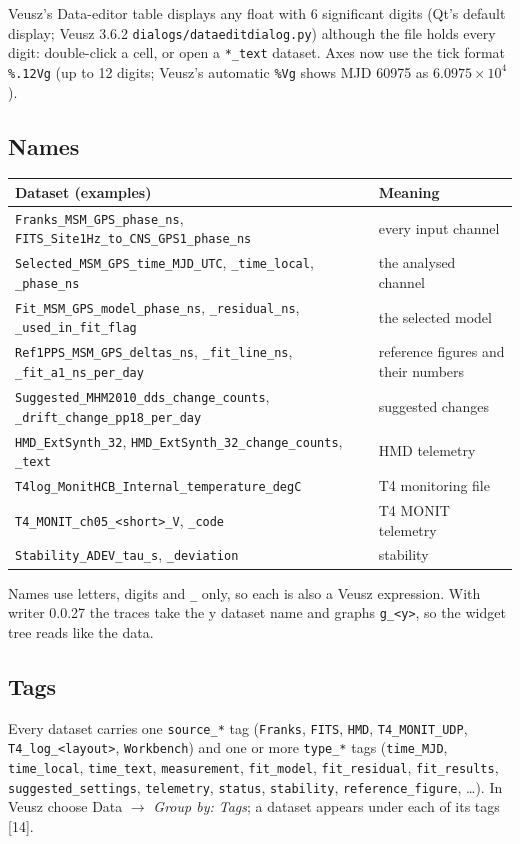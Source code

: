 \documentclass[11pt,a4paper]{article}
\begin{document}
Veusz's Data-editor table displays any float with 6 significant digits (Qt's default display; Veusz
3.6.2 \texttt{dialogs/dataeditdialog.py}) although the file holds every digit: double-click a cell,
or open a \texttt{*\_text} dataset. Axes now use the tick format \texttt{\%.12Vg} (up to 12 digits;
Veusz's automatic \texttt{\%Vg} shows MJD 60975 as \(6.0975\times10^4\)).

\subsection{Names}
\begin{center}
\small
\begin{tabular}{@{}p{.42\linewidth}p{.5\linewidth}@{}}
\toprule
Dataset (examples) & Meaning\\
\midrule
\texttt{Franks\_MSM\_GPS\_phase\_ns}, \texttt{FITS\_Site1Hz\_to\_CNS\_GPS1\_phase\_ns} & every input channel\\
\texttt{Selected\_MSM\_GPS\_time\_MJD\_UTC}, \texttt{\_time\_local}, \texttt{\_phase\_ns} & the analysed channel\\
\texttt{Fit\_MSM\_GPS\_model\_phase\_ns}, \texttt{\_residual\_ns}, \texttt{\_used\_in\_fit\_flag} & the selected model\\
\texttt{Ref1PPS\_MSM\_GPS\_deltas\_ns}, \texttt{\_fit\_line\_ns}, \texttt{\_fit\_a1\_ns\_per\_day} & reference figures and their numbers\\
\texttt{Suggested\_MHM2010\_dds\_change\_counts}, \texttt{\_drift\_change\_pp18\_per\_day} & suggested changes\\
\texttt{HMD\_ExtSynth\_32}, \texttt{HMD\_ExtSynth\_32\_\allowbreak change\_counts}, \texttt{\_text} & HMD telemetry\\
\texttt{T4log\_MonitHCB\_\allowbreak Internal\_temperature\_degC} & T4 monitoring file\\
\texttt{T4\_MONIT\_ch05\_<short>\_V}, \texttt{\_code} & T4 MONIT telemetry\\
\texttt{Stability\_ADEV\_tau\_s}, \texttt{\_deviation} & stability\\
\bottomrule
\end{tabular}
\end{center}
Names use letters, digits and \texttt{\_} only, so each is also a Veusz expression. With writer 0.0.27
the traces take the y dataset name and graphs \texttt{g\_<y>}, so the widget tree reads like the data.

\subsection{Tags}
Every dataset carries one \texttt{source\_*} tag (\texttt{Franks}, \texttt{FITS}, \texttt{HMD},
\texttt{T4\_MONIT\_UDP}, \texttt{T4\_log\_<layout>}, \texttt{Workbench}) and one or more
\texttt{type\_*} tags (\texttt{time\_MJD}, \texttt{time\_local}, \texttt{time\_text},
\texttt{measurement}, \texttt{fit\_model}, \texttt{fit\_residual}, \texttt{fit\_results},
\texttt{suggested\_settings}, \texttt{telemetry}, \texttt{status}, \texttt{stability},
\texttt{reference\_figure}, \ldots). In Veusz choose Data $\rightarrow$ \emph{Group by: Tags}; a dataset
appears under each of its tags [14].
\end{document}
